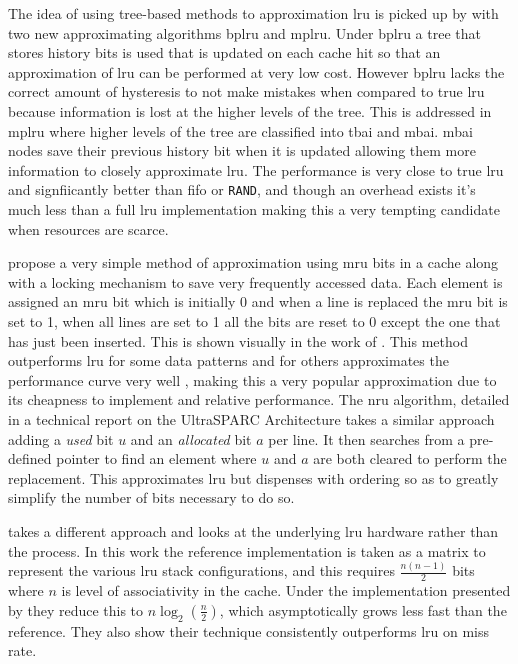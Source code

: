 The idea of using tree-based methods to approximation \gls{lru} is picked up by \citet{ghasemzadehModifiedPseudoLRU2006} with two new approximating algorithms \gls{bplru} and \gls{mplru}. Under \gls{bplru} a tree that stores history bits is used that is updated on each cache hit so that an approximation of \gls{lru} can be performed at very low cost. However \gls{bplru} lacks the correct amount of hysteresis to not make mistakes when compared to true \gls{lru} because information is lost at the higher levels of the tree. This is addressed in \gls{mplru} where higher levels of the tree are classified into \gls{tbai} and \gls{mbai}. \gls{mbai} nodes save their previous history bit when it is updated allowing them more information to closely approximate \gls{lru}. The performance is very close to true \gls{lru} and signfiicantly better than \gls{fifo} or \texttt{RAND}, and though an overhead exists it's much less than a full \gls{lru} implementation making this a very tempting candidate when resources are scarce.

\citet{malamy1994methods} propose a very simple method of approximation using \gls{mru} bits in a cache along with a locking mechanism to save very frequently accessed data. Each element is assigned an \gls{mru} bit which is initially 0 and when a line is replaced the \gls{mru} bit is set to 1, when all lines are set to 1 all the bits are reset to 0 except the one that has just been inserted. This is shown visually in the work of \citet{damienStudyDifferentCache2007}. This method outperforms \gls{lru} for some data patterns and for others approximates the performance curve very well \cite{al-zoubiPerformanceEvaluationCache2004}, making this a very popular approximation due to its cheapness to implement and relative performance. The \gls{nru} algorithm, detailed in a technical report on the UltraSPARC Architecture \cite{UltraSPARCT2Supplement2007} takes a similar approach adding a \emph{used} bit $u$ and an \emph{allocated} bit $a$ per line. It then searches from a pre-defined pointer to find an element where $u$ and $a$ are both cleared to perform the replacement. This approximates \gls{lru} but dispenses with ordering so as to greatly simplify the number of bits necessary to do so.

\citet{ghasemzadehPseudoFIFOArchitectureLRU2005} takes a different approach and looks at the underlying \gls{lru} hardware rather than the process. In this work the reference implementation is taken as a matrix to represent the various \gls{lru} stack configurations, and this requires $\frac{n(n-1)}{2}$ bits where $n$ is level of associativity in the cache. Under the implementation presented by \citet{ghasemzadehPseudoFIFOArchitectureLRU2005} they reduce this to $n\log_2\left(\frac{n}{2}\right)$, which asymptotically grows less fast than the reference. They also show their technique consistently outperforms \gls{lru} on miss rate.

